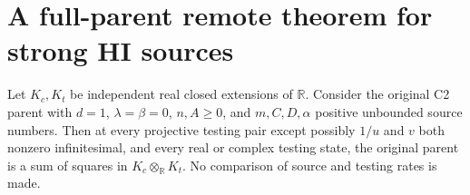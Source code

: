 \section{A full-parent remote theorem for strong HI sources}
\label{sec:hi-remote}
\begin{theorem}
Let $K_c,K_t$ be independent real closed extensions of $\mathbb R$.
Consider the original C2 parent with $d=1$, $\lambda=\beta=0$,
$n,A\geq0$, and $m,C,D,\alpha$ positive unbounded source numbers.
Then at every projective testing pair except possibly
$1/u$ and $v$ both nonzero infinitesimal, and every real or complex testing
state, the
original parent is a sum of squares in $K_c\otimes_{\mathbb R}K_t$.
No comparison of source and testing rates is made.
\end{theorem}

